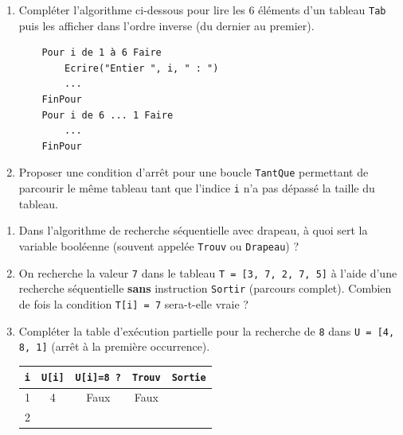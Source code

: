 \documentclass[11pt]{article}
\begin{document}
\begin{exercice}
\begin{enumerate}
    \item Compléter l'algorithme ci-dessous pour lire les 6 éléments d'un tableau \texttt{Tab} puis les afficher dans l'ordre inverse (du dernier au premier).
    \begin{verbatim}
    Pour i de 1 à 6 Faire
        Ecrire("Entier ", i, " : ")
        ...
    FinPour
    Pour i de 6 ... 1 Faire
        ...
    FinPour
    \end{verbatim}
    \item Proposer une condition d'arrêt pour une boucle \texttt{TantQue} permettant de parcourir le même tableau tant que l'indice \texttt{i} n'a pas dépassé la taille du tableau.
\end{enumerate}
\end{exercice}

\begin{exercice}
\begin{enumerate}
    \item Dans l'algorithme de recherche séquentielle avec drapeau, à quoi sert la variable booléenne (souvent appelée \texttt{Trouv} ou \texttt{Drapeau}) ?
    \item On recherche la valeur \texttt{7} dans le tableau \texttt{T = [3, 7, 2, 7, 5]} à l'aide d'une recherche séquentielle \textbf{sans} instruction \texttt{Sortir} (parcours complet). Combien de fois la condition \texttt{T[i] = 7} sera-t-elle vraie ?
    \item Compléter la table d'exécution partielle pour la recherche de \texttt{8} dans \texttt{U = [4, 8, 1]} (arrêt à la première occurrence).
    \begin{tabular}{|c|c|c|c|c|}
    \hline \texttt{i} & \texttt{U[i]} & \texttt{U[i]=8 ?} & \texttt{Trouv} & \texttt{Sortie} \\ \hline
    1 & 4 & Faux & Faux &  \\ \hline
    2 &   &       &       &  \\ \hline
    \end{tabular}
\end{enumerate}
\end{exercice}
\end{document}
